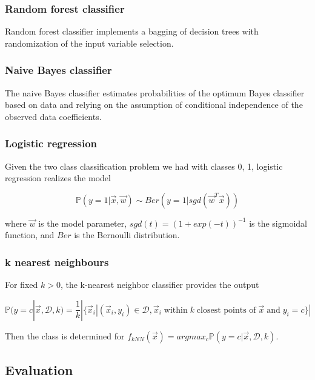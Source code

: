 \documentclass[a4paper,oneside,12pt]{article}
\begin{document}
\subsubsection{Random forest classifier}

Random forest classifier implements a bagging of decision trees with randomization of the input
variable selection.

\subsubsection{Naive Bayes classifier}

The naive Bayes classifier estimates probabilities of the optimum Bayes classifier based
on data and relying on the assumption of conditional independence of the observed data coefficients.

\subsubsection{Logistic regression}

Given the two class classification problem we had with classes {0, 1}, logistic regression realizes
the model

\begin{displaymath}
\mathbb{P}(y=1|\vec{x},\vec{w})\sim Ber(y=1|sgd(\vec{w}^T\vec{x}))
\end{displaymath}

where $\vec{w}$ is the model parameter,  $sgd(t)=(1+exp(-t))^{-1}$ is the sigmoidal function, and $Ber$ is the Bernoulli distribution.

\subsubsection{k nearest neighbours}

For fixed $k > 0$, the k-nearest neighbor classifier provides the output

\begin{displaymath}
\mathbb{P}(y=c|\vec{x},\mathcal{D},k)=\frac{1}{k}|\{\vec{x}_i|(\vec{x}_i,y_i)\in\mathcal{D},\vec{x}_i \;\text{within} \;k \;\text{closest points of}\; \vec{x}\; \text{and}\; y_i=c\}|
\end{displaymath}

Then the class is determined for $f_{kNN}(\vec{x}) = argmax_c\mathbb{P}(y = c|\vec{x},\mathcal{D}, k)$. 

\subsection{Evaluation}
\end{document}
